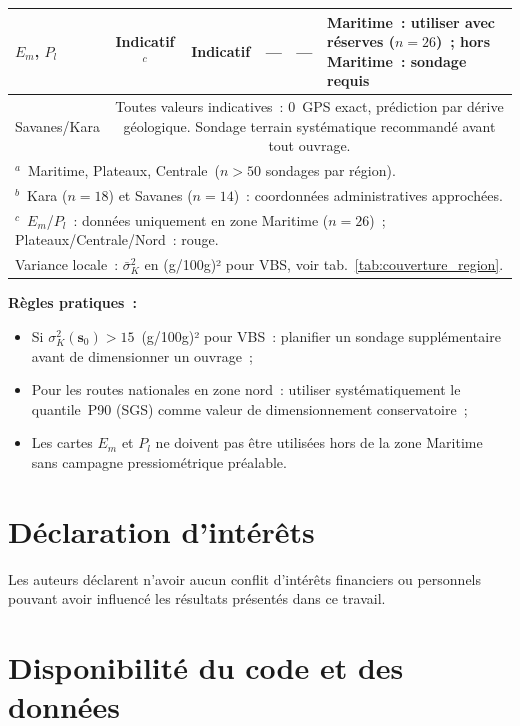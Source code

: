 \documentclass[10pt,a4paper,twocolumn]{article}
\newcommand{\bs}{\mathbf{s}}
\begin{document}
\begin{table}[!ht]
\begin{tabular}{lcccp{1.6cm}p{6.2cm}}
	$E_m$, $P_l$ & \cellcolor{orange!30}Indicatif$^c$
	             & \cellcolor{red!20}Indicatif
	             & ---
	             & ---
	             & Maritime~: utiliser avec réserves ($n=26$)~; hors Maritime~: sondage requis \\
	\midrule
	Savanes/Kara & \multicolumn{5}{p{12.5cm}}{\cellcolor{red!20}
		Toutes valeurs indicatives~: 0~GPS exact, prédiction par dérive géologique.
		Sondage terrain systématique recommandé avant tout ouvrage.} \\
	\bottomrule
	\multicolumn{6}{l}{\footnotesize $^a$~Maritime, Plateaux, Centrale~($n>50$ sondages par région).}\\
	\multicolumn{6}{l}{\footnotesize $^b$~Kara ($n=18$) et Savanes ($n=14$)~: coordonnées administratives approchées.}\\
	\multicolumn{6}{l}{\footnotesize $^c$~$E_m$/$P_l$~: données uniquement en zone Maritime ($n=26$)~; Plateaux/Centrale/Nord~: rouge.}\\
	\multicolumn{6}{l}{\footnotesize Variance locale~: $\bar{\sigma}^2_K$ en (g/100g)² pour VBS, voir tab.~\ref{tab:couverture_region}.}
\end{tabular}
\end{table}

\textbf{Règles pratiques~:}
\begin{itemize}[noitemsep]
	\item Si $\sigma^2_K(\bs_0) > 15$~(g/100g)² pour VBS~: planifier un sondage
	supplémentaire avant de dimensionner un ouvrage~;
	\item Pour les routes nationales en zone nord~: utiliser systématiquement
	le quantile~P90 (SGS) comme valeur de dimensionnement conservatoire~;
	\item Les cartes $E_m$ et $P_l$ ne doivent pas être utilisées hors
	de la zone Maritime sans campagne pressiométrique préalable.
\end{itemize}

\section*{Déclaration d'intérêts}

	Les auteurs déclarent n'avoir aucun conflit d'intérêts financiers
	ou personnels pouvant avoir influencé les résultats présentés dans
	ce travail.

\section*{Disponibilité du code et des données}
\end{document}

